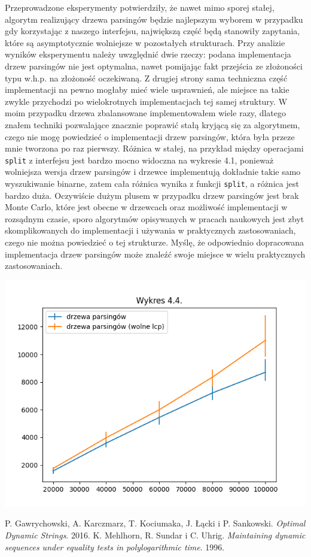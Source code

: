 \documentclass[declaration,shortabstract]{iithesis}
\theoremstyle{definition} \newtheorem{definition}{Definicja}[chapter]
\theoremstyle{remark} \newtheorem{remark}[definition]{Obserwacja}
\theoremstyle{plain} \newtheorem{theorem}[definition]{Twierdzenie}
\theoremstyle{remark} \newtheorem{example}{Przykład}[definition]
\theoremstyle{plain} \newtheorem{lemma}[definition]{Lemat}
\begin{document}
Przeprowadzone eksperymenty potwierdziły, że nawet mimo sporej stałej, algorytm realizujący drzewa parsingów będzie najlepszym wyborem w przypadku gdy korzystając z naszego interfejsu, największą część będą stanowiły zapytania, które są asymptotycznie wolniejsze w pozostałych strukturach. Przy analizie wyników eksperymentu należy uwzględnić dwie rzeczy: podana implementacja drzew parsingów nie jest optymalna, nawet pomijając fakt przejścia ze złożoności typu w.h.p. na złożoność oczekiwaną. Z drugiej strony sama techniczna część implementacji na pewno mogłaby mieć wiele usprawnień, ale miejsce na takie zwykle przychodzi po wielokrotnych implementacjach tej samej struktury. W moim przypadku drzewa zbalansowane implementowałem wiele razy, dlatego znałem techniki pozwalające znacznie poprawić stałą kryjącą się za algorytmem, czego nie mogę powiedzieć o implementacji drzew parsingów, która była przeze mnie tworzona po raz pierwszy. Różnica w stałej, na przykład między operacjami \texttt{split} z interfejsu jest bardzo mocno widoczna na wykresie 4.1, ponieważ wolniejsza wersja drzew parsingów i drzewce implementują dokładnie takie samo wyszukiwanie binarne, zatem cała różnica wynika z funkcji \texttt{split}, a różnica jest bardzo duża. Oczywiście dużym plusem w przypadku drzew parsingów jest brak Monte Carlo, które jest obecne w drzewcach oraz możliwość implementacji w rozsądnym czasie, sporo algorytmów opisywanych w pracach naukowych jest zbyt skomplikowanych do implementacji i używania w praktycznych zastosowaniach, czego nie można powiedzieć o tej strukturze. Myślę, że odpowiednio dopracowana implementacja drzew parsingów może znaleźć swoje miejsce w wielu praktycznych zastosowaniach.

\begin{center}
    \includegraphics[width=\textwidth]{losowy2.png}
\end{center}

\begin{thebibliography}{1}
P. Gawrychowski, A. Karczmarz, T. Kociumaka, J. Łącki i P. Sankowski.
\textit{Optimal Dynamic Strings}.
2016.
K. Mehlhorn, R. Sundar i C. Uhrig.
\textit{Maintaining dynamic sequences under equality tests in polylogarithmic time}. 1996.
\end{thebibliography}
\end{document}
